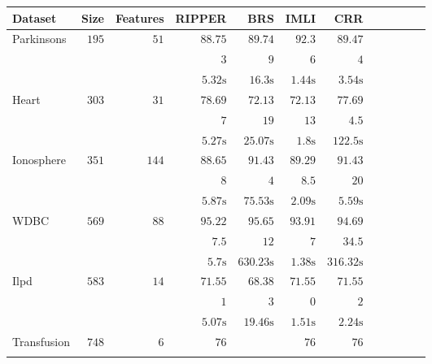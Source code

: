 \begin{table}
	\setlength{\tabcolsep}{3pt}
	\begin{center}
		\begin{tabular}{l  r  r r r r r r r rrr}
			\toprule
			{{Dataset}} & Size & Features  & RIPPER & BRS & IMLI & CRR\\
			\midrule
			{ Parkinsons}   & $  195 $  & $  51 $  & $   88.75  $    & $   89.74  $    & $   92.3  $    & $   89.47  $   \\ & & 
			& $   3 $    & $   9 $    & $   6 $    & $   4 $   \\ & & 
			& $   5.32 \text{s}  $    & $   16.3 \text{s}  $    & $   1.44 \text{s}  $    & $   3.54 \text{s}  $   \\[.1cm] 
			{ Heart}   & $  303 $  & $  31 $  & $   78.69  $    & $   72.13  $    & $   72.13  $    & $   77.69  $   \\ & & 
			& $   7 $    & $   19 $    & $   13 $    & $   4.5  $   \\ & & 
			& $   5.27 \text{s}  $    & $   25.07 \text{s}  $    & $   1.8 \text{s}  $    & $   122.5 \text{s}  $   \\[.1cm] 
			{ Ionosphere}   & $  351 $  & $  144 $  & $   88.65  $    & $   91.43  $    & $   89.29  $    & $   91.43  $   \\ & & 
			& $   8 $    & $   4 $    & $   8.5  $    & $   20 $   \\ & & 
			& $   5.87 \text{s}  $    & $   75.53 \text{s}  $    & $   2.09 \text{s}  $    & $   5.59 \text{s}  $   \\[.1cm] 
			{ WDBC}   & $  569 $  & $  88 $  & $   95.22  $    & $   95.65  $    & $   93.91  $    & $   94.69  $   \\ & & 
			& $   7.5  $    & $   12 $    & $   7 $    & $   34.5  $   \\ & & 
			& $   5.7 \text{s}  $    & $   630.23 \text{s}  $    & $   1.38 \text{s}  $    & $   316.32 \text{s}  $   \\[.1cm] 
			{ Ilpd}   & $  583 $  & $  14 $  & $   71.55  $    & $   68.38  $    & $   71.55  $    & $   71.55  $   \\ & & 
			& $   1 $    & $   3 $    & $   0 $    & $   2 $   \\ & & 
			& $   5.07 \text{s}  $    & $   19.46 \text{s}  $    & $   1.51 \text{s}  $    & $   2.24 \text{s}  $   \\[.1cm] 
			{ Transfusion}   & $  748 $  & $  6 $  & $   76 $    &   \multicolumn{1}{c}{\multirow{3}{*}{\textemdash}}       & $   76 $    & $   76 $   \\ & & 

\end{tabular}
\end{center}
\end{table}
